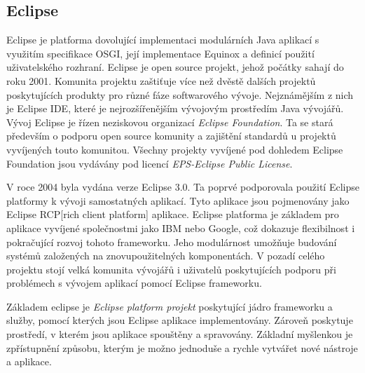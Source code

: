 \documentclass[ing,male,java,dept460]{diploma}		%
\begin{document}
\subsection{Eclipse}
Eclipse je platforma dovolující implementaci modulárních Java aplikací s využitím specifikace OSGI, její implementace Equinox a definicí použití uživatelského rozhraní. Eclipse je open source projekt, jehož počátky sahají do roku 2001. Komunita projektu zaštiťuje více než dvěstě dalších projektů poskytujících produkty pro různé fáze softwarového vývoje. Nejznámějším z nich je Eclipse IDE, které je nejrozšířenějším vývojovým prostředím Java vývojářů. Vývoj Eclipse je řízen neziskovou organizací \textit{Eclipse Foundation}. Ta se stará především o podporu open source komunity a zajištění standardů u projektů vyvíjených touto komunitou. Všechny projekty vyvíjené pod dohledem Eclipse Foundation jsou vydávány pod licencí \textit{EPS-Eclipse Public License}. 
\par V roce 2004 byla vydána verze Eclipse 3.0. Ta poprvé podporovala použití Eclipse platformy k vývoji samostatných aplikací. Tyto aplikace jsou pojmenovány jako Eclipse RCP[rich client platform] aplikace. Eclipse platforma je základem pro aplikace vyvíjené společnostmi jako IBM nebo Google, což dokazuje flexibilnost i pokračující rozvoj tohoto frameworku. Jeho modulárnost umožňuje budování systémů založených na znovupoužitelných komponentách. V pozadí celého projektu stojí velká komunita vývojářů i uživatelů poskytujících podporu při problémech s vývojem aplikací pomocí Eclipse frameworku.
\par Základem eclipse je \textit{Eclipse platform projekt} poskytující jádro frameworku a služby, pomocí kterých jsou Eclipse aplikace implementovány. Zároveň poskytuje prostředí, v kterém jsou aplikace spouštěny a spravovány. Základní myšlenkou je zpřístupnění způsobu, kterým je možno jednoduše a rychle vytvářet nové nástroje a aplikace.
\end{document}
